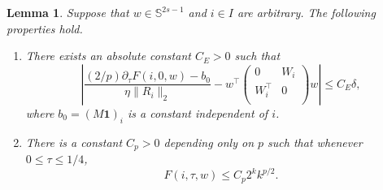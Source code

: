 \documentclass[10pt,a4paper]{amsart}
\newtheorem{lemma}{Lemma}
\newcommand{\Sph}{\mathbb{S}}
\begin{document}
\begin{lemma}\label{lem:F_properties}
Suppose that $w\in \Sph^{2s-1}$ and $i\in I$ are arbitrary. The following properties hold.
\begin{enumerate}[label=(\roman*)]
	\item There exists an absolute constant $C_E > 0$ such that
	\[
		\left|	\frac{(2/p)\partial_\tau F(i,0,w) - b_0}{\eta\|R_i\|_2} 
		- w^\top \begin{pmatrix}
			        0 & W_i \\
			        W_i^\top & 0 \\
				 \end{pmatrix} w \right|
		\le C_E\delta,
	\]
	where $b_0 = (M\mathbf{1})_i$ is a constant independent of $i$.
	
	\item There is a constant $C_p > 0$ depending only on $p$ such that whenever $0\leq \tau \leq 1/4$,
	\[
		F(i,\tau,w)	\le C_p 2^k k^{p/2}.
	\]
\end{enumerate}
\end{lemma}
\end{document}

